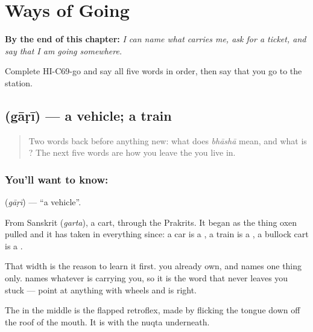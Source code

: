 
\chapter{Ways of Going}
\label{ch:hi-ways-of-going}

\begin{chapteropening}
\textbf{By the end of this chapter:} \emph{I can name what carries me, ask for a ticket, and say that I am going somewhere.}

Complete HI-C69-go and say all five words in order, then say that you go to the station.
\end{chapteropening}

\section[gāṛī]{ (gāṛī) — a vehicle; a train}

\label{lesson:HI-C69-vehicle}



\begin{quote}
Two words back before anything new: what does \emph{bhāshā} mean, and what is \textbf{}? The next five words are how you leave the  you live in.
\end{quote}

\subsection*{You'll want to know: }
\textbf{} (\emph{gāṛī}) — \textquotedblleft{}a vehicle\textquotedblright{}.

From Sanskrit  (\emph{garta}), a cart, through the Prakrits. It began as the thing oxen pulled and it has taken in everything since: a car is a , a train is a , a bullock cart is a .

That width is the reason to learn it first. \textbf{} you already own, and  names one thing only.  names whatever is carrying you, so it is the word that never leaves you stuck — point at anything with wheels and  is right.

The  in the middle is the flapped retroflex, made by flicking the tongue down off the roof of the mouth. It is  with the nuqta underneath.

